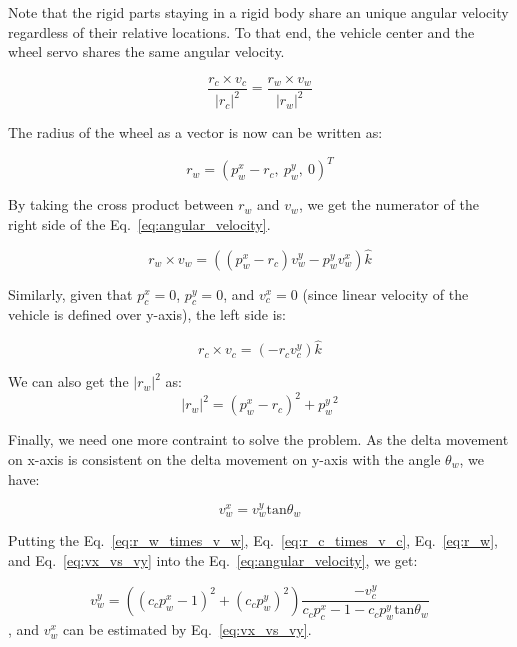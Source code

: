 \documentclass[a4paper]{article}
\begin{document}
Note that the rigid parts staying in a rigid body share an unique angular velocity regardless of their relative locations. To that end, the vehicle center and the wheel servo shares the same angular velocity.

\begin{equation}
\frac{r_c \times v_c}{|r_c|^2} = \frac{r_w \times v_w}{|r_w|^2}
\label{eq:angular_velocity}
\end{equation}

The radius of the wheel as a vector is now can be written as:

\begin{equation}
r_w = (p^x_w - r_c,~p^y_w,~0)^T
\label{eq:radius_of_wheel}
\end{equation}

By taking the cross product between $r_w$ and $v_w$, we get the numerator of the right side of the Eq.~\ref{eq:angular_velocity}.

\begin{equation}
r_w \times v_w = ((p^x_w - r_c) v^y_w - p^y_w v^x_w)\hat{k}
\label{eq:r_w_times_v_w}
\end{equation}

Similarly, given that $p^x_c=0$, $p^y_c=0$, and $v^x_c=0$ (since linear velocity of the vehicle is defined over y-axis), the left side is:

\begin{equation}
r_c \times v_c = (-r_c v^y_c)\hat{k}
\label{eq:r_c_times_v_c}
\end{equation}

We can also get the $|r_w|^2$ as:
\begin{equation}
|r_w|^2 = (p^x_w - r_c)^2 + {p^y_w}^2
\label{eq:r_w}
\end{equation}

Finally, we need one more contraint to solve the problem. As the delta movement on x-axis is consistent on the delta movement on y-axis with the angle $\theta_w$, we have:

\begin{equation}
v^x_w = v^y_w \text{tan}\theta_w
\label{eq:vx_vs_vy}
\end{equation}


Putting the Eq.~\ref{eq:r_w_times_v_w}, Eq.~\ref{eq:r_c_times_v_c}, Eq.~\ref{eq:r_w}, and Eq.~\ref{eq:vx_vs_vy} into the Eq.~\ref{eq:angular_velocity}, we get:

\begin{equation}
v^y_w = ((c_c p^x_w - 1)^2 + (c_c p^y_w)^2) \frac{-v^y_c}{c_c p^x_c - 1 - c_c p^y_w \text{tan}\theta_w}
\label{eq:vy}
\end{equation}
, and $v^x_w$ can be estimated by Eq.~\ref{eq:vx_vs_vy}.
\end{document}
